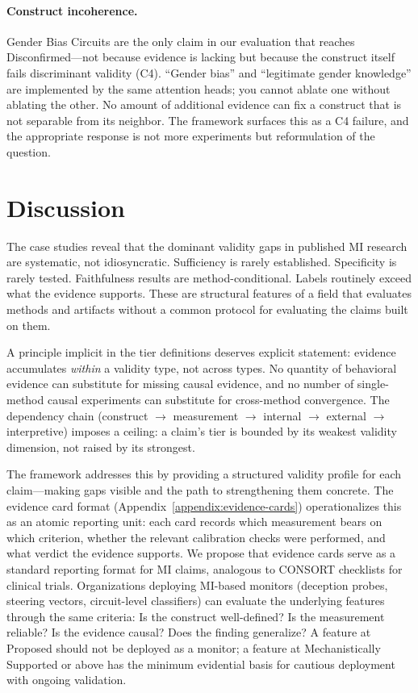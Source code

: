 \documentclass{article}
\begin{document}
\paragraph{Construct incoherence.} Gender Bias Circuits are the only claim in our evaluation that reaches Disconfirmed---not because evidence is lacking but because the construct itself fails discriminant validity (C4). ``Gender bias'' and ``legitimate gender knowledge'' are implemented by the same attention heads; you cannot ablate one without ablating the other. No amount of additional evidence can fix a construct that is not separable from its neighbor. The framework surfaces this as a C4 failure, and the appropriate response is not more experiments but reformulation of the question.

\section{Discussion}
\label{sec:discussion}

The case studies reveal that the dominant validity gaps in published MI research are systematic, not idiosyncratic. Sufficiency is rarely established. Specificity is rarely tested. Faithfulness results are method-conditional. Labels routinely exceed what the evidence supports. These are structural features of a field that evaluates methods and artifacts without a common protocol for evaluating the claims built on them.

A principle implicit in the tier definitions deserves explicit statement: evidence accumulates \emph{within} a validity type, not across types.  No quantity of behavioral evidence can substitute for missing causal evidence, and no number of single-method causal experiments can substitute for cross-method convergence.  The dependency chain (construct $\to$ measurement $\to$ internal $\to$ external $\to$ interpretive) imposes a ceiling: a claim's tier is bounded by its weakest validity dimension, not raised by its strongest.

The framework addresses this by providing a structured validity profile for each claim---making gaps visible and the path to strengthening them concrete. The evidence card format (Appendix~\ref{appendix:evidence-cards}) operationalizes this as an atomic reporting unit: each card records which measurement bears on which criterion, whether the relevant calibration checks were performed, and what verdict the evidence supports. We propose that evidence cards serve as a standard reporting format for MI claims, analogous to CONSORT checklists for clinical trials. Organizations deploying MI-based monitors (deception probes, steering vectors, circuit-level classifiers) can evaluate the underlying features through the same criteria: Is the construct well-defined? Is the measurement reliable? Is the evidence causal? Does the finding generalize? A feature at Proposed should not be deployed as a monitor; a feature at Mechanistically Supported or above has the minimum evidential basis for cautious deployment with ongoing validation.
\end{document}
